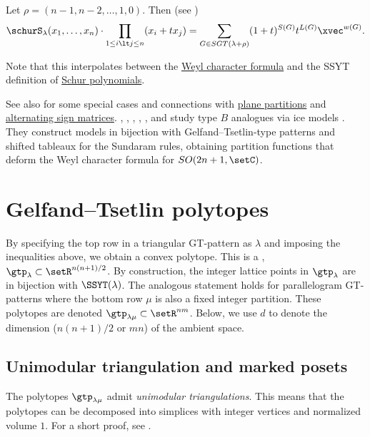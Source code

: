 Let $\rho = (n-1,n-2,\dotsc,1,0)$.  Then (see \cite{Tokuyama1988})
\begin{equation*}
\schurS_{\lambda}(x_1,\dotsc,x_n)
\cdot
\prod_{1 \leq i \lt j \leq n} (x_i + t x_j)
=
\sum_{G \in SGT(\lambda + \rho)} (1+t)^{S(G)} t^{L(G)}\xvec^{w(G)}.
\end{equation*}

Note that this interpolates between the
\hyperref[schurWeylformula]{Weyl character formula} and the SSYT definition
of \hyperref[schurS]{Schur polynomials}.


See also \cite{Stanley1986} for some special cases and connections with
\hyperref[planePartitions]{plane partitions} and
\hyperref[alternatingSignMatrixDefinition]{alternating sign matrices}.
, , ,
, , and  study
type $B$ analogues via ice models \cite{AlexandrComminsEmbryFrankLiVetter2018x}.
They construct models in bijection with Gelfand--Tsetlin-type patterns and
shifted tableaux for the Sundaram rules, obtaining partition functions that
deform the Weyl character formula for $SO(2n+1,\setC)$.

\section[gtpolytopes]{Gelfand--Tsetlin polytopes}

By specifying the top row in a triangular GT-pattern as $\lambda$
and imposing the inequalities above, we obtain a convex polytope.
This is a \label{gtPolytope},
$\gtp_{\lambda} \subset \setR^{n(n+1)/2}$.
By construction, the integer lattice points in $\gtp_{\lambda}$
are in bijection with $\SSYT(\lambda)$.
The analogous statement holds for parallelogram GT-patterns where the bottom
row $\mu$ is also a fixed integer partition.
These polytopes are denoted $\gtp_{\lambda\mu} \subset \setR^{nm}$.
Below, we use $d$ to denote the dimension ($n(n+1)/2$ or $mn$) of the
ambient space.


\subsection[gtpolytopesMarkedPoset]{Unimodular triangulation and marked posets}

The polytopes $\gtp_{\lambda\mu}$ admit \emph{unimodular triangulations}.
This means that the polytopes can be decomposed into simplices with integer
vertices and normalized volume $1$.  For a short proof, see
\cite{Alexandersson2019CounterExamples}.


